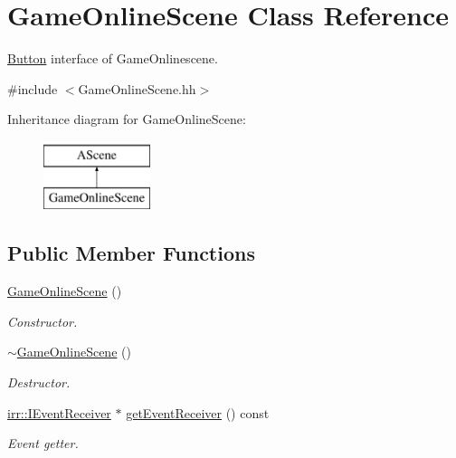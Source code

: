\hypertarget{classGameOnlineScene}{}\section{Game\+Online\+Scene Class Reference}
\label{classGameOnlineScene}


\hyperlink{classButton}{Button} interface of Game\+Onlinescene.  




{\ttfamily \#include $<$Game\+Online\+Scene.\+hh$>$}

Inheritance diagram for Game\+Online\+Scene\+:\begin{figure}[H]
\begin{center}
\leavevmode
\includegraphics[height=2.000000cm]{classGameOnlineScene}
\end{center}
\end{figure}
\subsection*{Public Member Functions}
\begin{DoxyCompactItemize}
\item 
\hyperlink{classGameOnlineScene_a057362d043c386aa2b6789baf548fa09}{Game\+Online\+Scene} ()
\begin{DoxyCompactList}\small\item\em Constructor. \end{DoxyCompactList}\item 
\hyperlink{classGameOnlineScene_a59b127983ae2338edcf0b8bd86ff9f96}{$\sim$\+Game\+Online\+Scene} ()
\begin{DoxyCompactList}\small\item\em Destructor. \end{DoxyCompactList}\item 
\hyperlink{classirr_1_1IEventReceiver}{irr\+::\+I\+Event\+Receiver} $\ast$ \hyperlink{classGameOnlineScene_a00ce9773db4f1886fc463b023cbf63f9}{get\+Event\+Receiver} () const
\begin{DoxyCompactList}\small\item\em Event getter. \end{DoxyCompactList}\end{DoxyCompactItemize}


